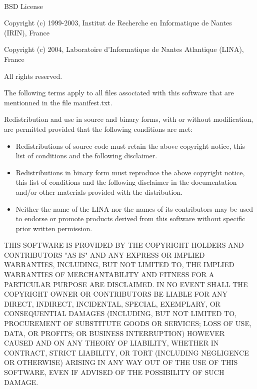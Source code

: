 
\Softname{} \Softversion{}\\
BSD License

\medskip

Copyright (c) 1999-2003,
Institut de Recherche en Informatique de Nantes (IRIN), France
 
Copyright (c) 2004,
Laboratoire d'Informatique de Nantes Atlantique (LINA), France
 
All rights reserved.

\medskip

The following terms apply to all files associated with this software
that are mentionned in the file manifest.txt.

\medskip

Redistribution and use in source and binary forms, with or without
modification, are permitted provided that the following conditions are
met:

\begin{itemize}
\item Redistributions of source code must retain the above copyright
      notice, this list of conditions and the following disclaimer.
 
\item Redistributions in binary form must reproduce the above
      copyright notice, this list of conditions and the following
      disclaimer in the documentation and/or other materials provided
      with the distribution.

\item Neither the name of the LINA nor the names of its
      contributors may be used to endorse or promote products derived
      from this software without specific prior written permission.
\end{itemize}

\medskip
\medskip

THIS SOFTWARE IS PROVIDED BY THE COPYRIGHT HOLDERS AND CONTRIBUTORS
"AS IS" AND ANY EXPRESS OR IMPLIED WARRANTIES, INCLUDING, BUT NOT
LIMITED TO, THE IMPLIED WARRANTIES OF MERCHANTABILITY AND FITNESS FOR
A PARTICULAR PURPOSE ARE DISCLAIMED. IN NO EVENT SHALL THE COPYRIGHT
OWNER OR CONTRIBUTORS BE LIABLE FOR ANY DIRECT, INDIRECT, INCIDENTAL,
SPECIAL, EXEMPLARY, OR CONSEQUENTIAL DAMAGES (INCLUDING, BUT NOT
LIMITED TO, PROCUREMENT OF SUBSTITUTE GOODS OR SERVICES; LOSS OF USE,
DATA, OR PROFITS; OR BUSINESS INTERRUPTION) HOWEVER CAUSED AND ON ANY
THEORY OF LIABILITY, WHETHER IN CONTRACT, STRICT LIABILITY, OR TORT
(INCLUDING NEGLIGENCE OR OTHERWISE) ARISING IN ANY WAY OUT OF THE USE
OF THIS SOFTWARE, EVEN IF ADVISED OF THE POSSIBILITY OF SUCH DAMAGE.
